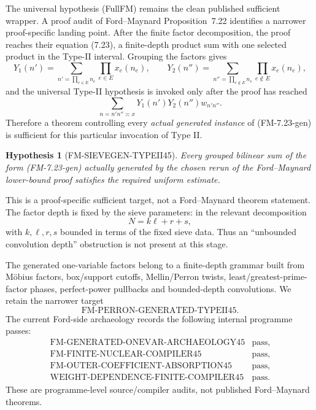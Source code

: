 \documentclass[11pt]{article}
\newtheorem{hypothesis}[theorem]{Hypothesis}
\theoremstyle{definition}
\theoremstyle{remark}
\newcommand{\1}{\mathbf 1}
\begin{document}
The universal hypothesis (FullFM) remains the clean published sufficient wrapper.  A proof audit of
Ford--Maynard Proposition~7.22 identifies a narrower proof-specific landing point.  After the finite factor
decomposition, the proof reaches their equation (7.23), a finite-depth product sum with one selected product in
the Type-II interval.  Grouping the factors gives
\[
 Y_1(n')=
 \sum_{n'=\prod_{e\in E}n_e}\prod_{e\in E}x_e(n_e),\qquad
 Y_2(n'')=
 \sum_{n''=\prod_{e\notin E}n_e}\prod_{e\notin E}x_e(n_e),
\tag{FM-Y12}
\]
and the universal Type-II hypothesis is invoked only after the proof has reached
\[
 \boxed{
 \sum_{n=n'n''\asymp x}Y_1(n')Y_2(n'')w_{n'n''}.}
\tag{FM-7.23-gen}
\]
Therefore a theorem controlling every \emph{actual generated instance} of (FM-7.23-gen) is sufficient for this
particular invocation of Type II.

\begin{hypothesis}[FM-SIEVEGEN-TYPEII45]\label{hyp:FMSieveGen}
Every grouped bilinear sum of the form (FM-7.23-gen) actually generated by the chosen rerun of the
Ford--Maynard lower-bound proof satisfies the required uniform estimate.
\end{hypothesis}

This is a proof-specific sufficient target, not a Ford--Maynard theorem statement.  The factor depth is fixed by
the sieve parameters: in the relevant decomposition
\[
 \boxed{N=k\ell+r+s,}
\tag{FM-depth}
\]
with $k,\ell,r,s$ bounded in terms of the fixed sieve data.  Thus an ``unbounded convolution depth'' obstruction is
not present at this stage.

The generated one-variable factors belong to a finite-depth grammar built from M\"obius factors, box/support
cutoffs, Mellin/Perron twists, least/greatest-prime-factor phases, perfect-power pullbacks and bounded-depth
convolutions.  We retain the narrower target
\[
 \boxed{\mathrm{FM\!\mbox{-}PERRON\!\mbox{-}GENERATED\!\mbox{-}TYPEII45}.}
\tag{FM-PerronGen}
\]
The current Ford-side archaeology records the following internal programme passes:
\[
\begin{array}{ll}
\mathrm{FM\!\mbox{-}GENERATED\!\mbox{-}ONEVAR\!\mbox{-}ARCHAEOLOGY45} & \text{pass},\\
\mathrm{FM\!\mbox{-}FINITE\!\mbox{-}NUCLEAR\!\mbox{-}COMPILER45} & \text{pass},\\
\mathrm{FM\!\mbox{-}OUTER\!\mbox{-}COEFFICIENT\!\mbox{-}ABSORPTION45} & \text{pass},\\
\mathrm{WEIGHT\!\mbox{-}DEPENDENCE\!\mbox{-}FINITE\!\mbox{-}COMPILER45} & \text{pass}.
\end{array}
\tag{FM-archaeology}
\]
These are programme-level source/compiler audits, not published Ford--Maynard theorems.
\end{document}
